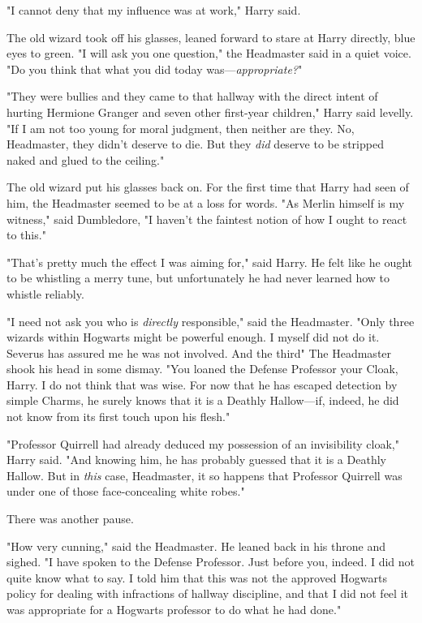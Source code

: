 "I cannot deny that my influence was at work," Harry said.

The old wizard took off his glasses, leaned forward to stare at Harry directly,
blue eyes to green. "I will ask you one question," the Headmaster said in a
quiet voice. "Do you think that what you did today was---\emph{appropriate?}"

"They were bullies and they came to that hallway with the direct intent of
hurting Hermione Granger and seven other first-year children," Harry said
levelly. "If I am not too young for moral judgment, then neither are they. No,
Headmaster, they didn't deserve to die. But they \emph{did} deserve to be
stripped naked and glued to the ceiling."

The old wizard put his glasses back on. For the first time that Harry had seen
of him, the Headmaster seemed to be at a loss for words. "As Merlin himself is
my witness," said Dumbledore, "I haven't the faintest notion of how I ought to
react to this."

"That's pretty much the effect I was aiming for," said Harry. He felt like he
ought to be whistling a merry tune, but unfortunately he had never learned how
to whistle reliably.

"I need not ask you who is \emph{directly} responsible," said the Headmaster.
"Only three wizards within Hogwarts might be powerful enough. I myself did not
do it. Severus has assured me he was not involved. And the third{\el}" The
Headmaster shook his head in some dismay. "You loaned the Defense Professor
your Cloak, Harry. I do not think that was wise. For now that he has escaped
detection by simple Charms, he surely knows that it is a Deathly Hallow---if,
indeed, he did not know from its first touch upon his flesh."

"Professor Quirrell had already deduced my possession of an invisibility
cloak," Harry said. "And knowing him, he has probably guessed that it is a
Deathly Hallow. But in \emph{this} case, Headmaster, it so happens that
Professor Quirrell was under one of those face-concealing white robes."

There was another pause.

"How very cunning," said the Headmaster. He leaned back in his throne and
sighed. "I have spoken to the Defense Professor. Just before you, indeed. I did
not quite know what to say. I told him that this was not the approved Hogwarts
policy for dealing with infractions of hallway discipline, and that I did not
feel it was appropriate for a Hogwarts professor to do what he had done."

